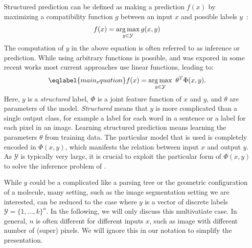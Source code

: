 Structured prediction can be defined as making a prediction $f(x)$ by maximizing a
compatibility function $g$ between an input $x$ and possible labels
$y$~\citep{nowozin2011structured}:
\begin{equation}
    f(x) = \operatorname*{arg\,max}_{y \in \mathcal{Y}} g(x, y)
\end{equation}
The computation of $y$ in the above equation is often referred to as inference
or prediction.
While using arbitrary functions is possible, and was expored
in some recent works %
most current approaches use linear functions, leading to:
\begin{equation}\eqlabel{main_equation}
    f(x) = \argmax_{y \in \mathcal{Y}}\  \theta^T \Phi(x, y).
\end{equation}
Here, $y$ is a \emph{structured} label, $\Phi$ is a joint feature function of
$x$ and $y$, and $\theta$ are parameters of the model. \emph{Structured} means
that $y$ is more complicated than a single output class, for example a label
for each word in a sentence or a label for each pixel in an image.
Learning structured prediction means learning the parameters $\theta$ from training data.
The particular model that is used is completely encoded in $\Phi(x, y)$, which manifests
the relation between input $x$ and output $y$. As $\mathcal{Y}$ is typically very large,
it is crucial to exploit the particular form of $\Phi(x, y)$ to solve the inference problem
of .

While $y$ could be a complicated like a parsing tree or the geometric
configuration of a molecule, many setting, such as the image segmentation
setting we are interested, can be reduced to the case where $y$ is a vector of
discrete labels $\mathcal{Y} = \{1, \dotsc, k\}^n$.
In the following, we will only discuss this multivatiate case. In general, $n$ is often different
for different inputs $x$, such as image with different number of (super) pixels.
We will ignore this in our notation to simplify the presentation.

